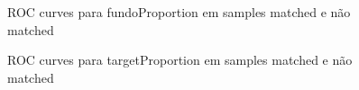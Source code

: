 \documentclass{article}
\begin{document}
\begin{figure}[H]
  \caption{ROC curves para fundoProportion em samples matched e não matched}
  \noindent{}
  \centering
\end{figure}

\begin{figure}[H]
  \caption{ROC curves para targetProportion em samples matched e não matched}
  \noindent{}
  \centering
\end{figure}
\end{document}
